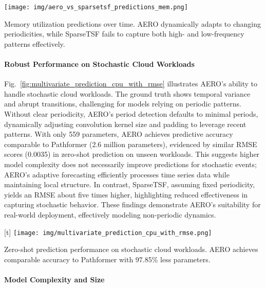 \documentclass{ieeetmlcn}
\begin{document}
\par\medskip\begin{center}\centering
\texttt{[image: img/aero\_vs\_sparsetsf\_predictions\_mem.png]}
\caption{Memory utilization predictions over time. AERO dynamically adapts to changing periodicities, while SparseTSF fails to capture both high- and low-frequency patterns effectively.}
\label{fig:aero_vs_sparsetsf_predictions_mem}\end{center}\medskip\par

\paragraph*{Robust Performance on Stochastic Cloud Workloads}
\label{para:stochastic_workload_performance}
{\color{blue}
Fig.~\ref{fig:multivariate_prediction_cpu_with_rmse} illustrates AERO's ability to handle stochastic cloud workloads. The ground truth shows temporal variance and abrupt transitions, challenging for models relying on periodic patterns. Without clear periodicity, AERO's period detection defaults to minimal periods, dynamically adjusting convolution kernel size and padding to leverage recent patterns. With only 559 parameters, AERO achieves predictive accuracy comparable to Pathformer (2.6 million parameters), evidenced by similar RMSE scores (0.0035) in zero-shot prediction on unseen workloads. This suggests higher model complexity does not necessarily improve predictions for stochastic events; AERO's adaptive forecasting efficiently processes time series data while maintaining local structure. In contrast, SparseTSF, assuming fixed periodicity, yields an RMSE about five times higher, highlighting reduced effectiveness in capturing stochastic behavior. These findings demonstrate AERO's suitability for real-world deployment, effectively modeling non-periodic dynamics.
}


\par\medskip\begin{center}[t]
    \centering
    \texttt{[image: img/multivariate\_prediction\_cpu\_with\_rmse.png]}
    \caption{Zero-shot prediction performance on stochastic cloud workloads. AERO achieves comparable accuracy to Pathformer with 97.85\% less parameters.}
    \label{fig:multivariate_prediction_cpu_with_rmse}\end{center}\medskip\par
    
\paragraph*{Model Complexity and Size}
\label{sec:modelcomplexity}
\end{document}
